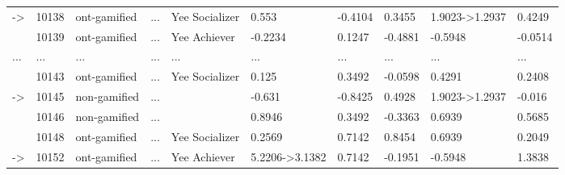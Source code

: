 \documentclass[6pt,a4paper]{article}
\begin{document}
{\begin{longtable}{llllllllll}
-\textgreater &10138&ont-gamified&...&Yee Socializer&0.553&-0.4104&0.3455&1.9023-\textgreater 1.2937&0.4249\tabularnewline
&10139&ont-gamified&...&Yee Achiever&-0.2234&0.1247&-0.4881&-0.5948&-0.0514\tabularnewline
...&...&...&...&...&...&...&...&...&...\tabularnewline
&10143&ont-gamified&...&Yee Socializer&0.125&0.3492&-0.0598&0.4291&0.2408\tabularnewline
-\textgreater &10145&non-gamified&...&&-0.631&-0.8425&0.4928&1.9023-\textgreater 1.2937&-0.016\tabularnewline
&10146&non-gamified&...&&0.8946&0.3492&-0.3363&0.6939&0.5685\tabularnewline
&10148&ont-gamified&...&Yee Socializer&0.2569&0.7142&0.8454&0.6939&0.2049\tabularnewline
-\textgreater &10152&ont-gamified&...&Yee Achiever&5.2206-\textgreater 3.1382&0.7142&-0.1951&-0.5948&1.3838\tabularnewline
\hline
\end{longtable}}
\end{document}
